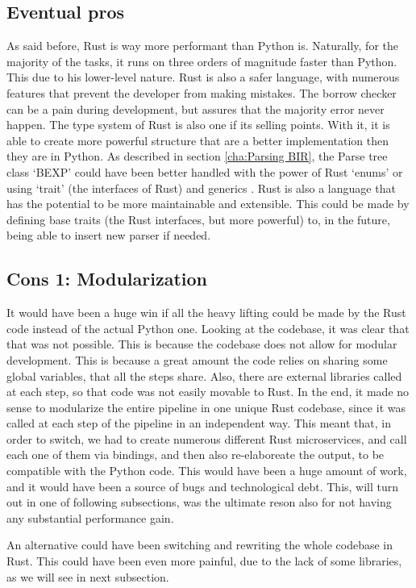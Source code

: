 \subsection[Eventual pros]{Eventual pros}
As said before, Rust is way more performant than Python is. Naturally, for the
majority of the tasks, it runs on three orders of magnitude faster than Python.
This due to his lower-level nature. Rust is also a safer language, with numerous
features that prevent the developer from making mistakes. The borrow checker can
be a pain during development, but assures that the majority error never happen. The
type system of Rust is also one if its selling points. With it, it is able to create
more powerful structure that are a better implementation then they are in Python.
As described in section \ref{cha:Parsing BIR}, the Parse tree class `BEXP' could
have been better handled with the power of Rust `enums' or using `trait' (the
interfaces of Rust) and generics . Rust is also a language that has the potential
to be more maintainable and extensible. This could be made by defining base
traits (the Rust interfaces, but more powerful) to, in the future, being able to
insert new parser if needed.

\subsection[Modularization]{Cons 1: Modularization}
It would have been a huge win if all the heavy lifting could be made by the Rust
code instead of the actual Python one. Looking at the codebase, it was clear that
that was not possible. This is because the codebase does not allow for modular
development. This is because a great amount the code relies on sharing some global
variables, that all the steps share. Also, there are external libraries called
at each step, so that code was not easily movable to Rust. In the end, it made no
sense to modularize the entire pipeline in one unique Rust codebase, since it
was called at each step of the pipeline in an independent way. This meant that,
in order to switch, we had to create numerous different Rust microservices, and
call each one of them via bindings, and then also re-elaboreate the output, to
be compatible with the Python code. This would have been a huge amount of work,
and it would have been a source of bugs and technological debt. This, will turn
out in one of following subsections, was the ultimate reson also for not having any
substantial performance gain.

An alternative could have been switching and rewriting the whole codebase in Rust.
This could have been even more painful, due to the lack of some libraries, as we
will see in next subsection.

